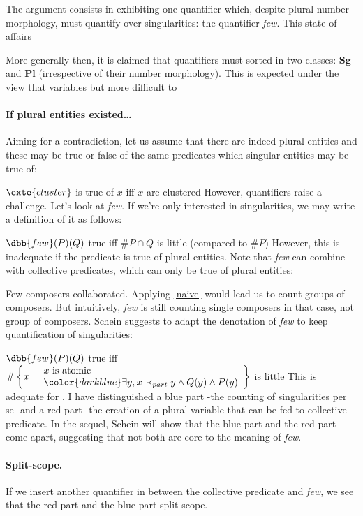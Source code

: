 The argument consists in exhibiting one quantifier which, despite plural number morphology, must quantify over singularities: the quantifier \emph{few}. This state of affairs

More generally then, it is claimed that quantifiers must sorted in two classes: \textbf{Sg} and \textbf{Pl} (irrespective of their number morphology). This is expected under the view that variables but more difficult to 

\paragraph{If plural entities existed\ldots}
%
Aiming for a contradiction, let us assume that there are indeed plural entities and these may be true or false of the same predicates which singular entities may be true of:

\ex
$\exte{cluster}$ is true of $x$ iff $x$ are clustered
\xe
%
However, quantifiers raise a challenge. Let's look at \emph{few}. If we're only interested in singularities, we may write a definition of it as follows:

\ex \label{naive}
 $\dbb{few}(P)(Q)$ true iff $\#P\cap Q$ is little (compared to $\#P$)
\xe
%
However, this is inadequate if the predicate is true of plural entities. Note that \emph{few} can combine with collective predicates, which can only be true of plural entities:

\ex\label{collab}
Few composers collaborated.
\xe
%
Applying \cref{naive} would lead us to count groups of composers. But intuitively, \emph{few} is still counting single composers in that case, not group of composers. Schein suggests to adapt the denotation of \emph{few} to keep quantification of singularities:

\ex
{\color{darkred}$\dbb{few}(P)(Q)$ true iff $\#\left\lbrace x\ \middle|\ 
\begin{array}{l}
x\text{ is atomic}\\
{\color{darkblue}\exists y, x\prec_{part} y \wedge Q(y) \wedge P(y)}
\end{array}
\right\rbrace$ is little \label{few2}
}\xe
%
This is adequate for . I have distinguished a blue part -the counting of singularities per se- and a red part -the creation of a plural variable that can be fed to collective predicate.
In the sequel, Schein will show that the blue part and the red part come apart, suggesting that not both are core to the meaning of \emph{few}.

\paragraph{Split-scope.} If we insert another quantifier in between the collective predicate and \emph{few}, we see that the red part and the blue part split scope.


